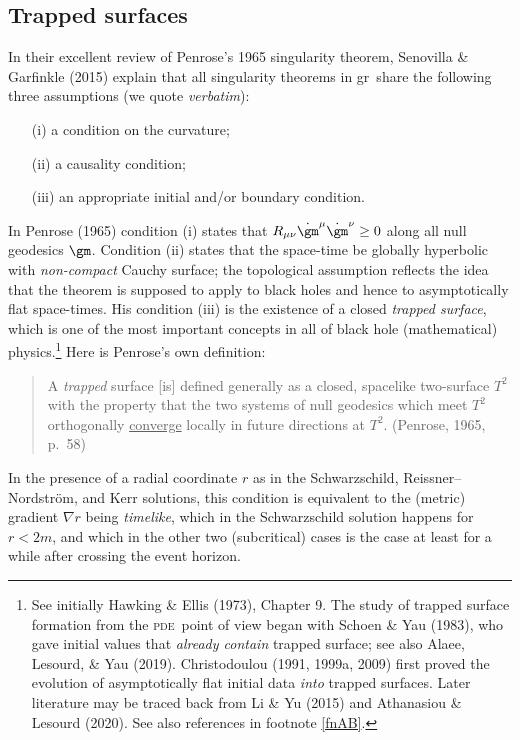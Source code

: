\documentclass[11pt,a4paper]{article}
\newcommand{\pde}{\textsc{pde}}
\newcommand{\GR}{{\sc gr}}
\begin{document}
\subsection{Trapped surfaces}
In their excellent review of Penrose's 1965 singularity theorem, Senovilla \& Garfinkle (2015) explain that all singularity theorems in \GR\ share the following three assumptions (we quote \emph{verbatim}):
\begin{enumerate}
\item[(i)] a condition on the curvature;
 \item[(ii)] a causality condition;
 \item[(iii)] an appropriate initial and/or boundary condition.
\end{enumerate}
In Penrose (1965) condition (i) states that $R_{\mu\nu}\dot{\gm}^{\mu}\dot{\gm}^{\nu}\geq 0$ along all null geodesics $\gm$.
Condition (ii) states that the space-time be globally hyperbolic with \emph{non-compact} Cauchy surface; the topological assumption reflects the idea  that the theorem is supposed to apply to black holes and hence to asymptotically flat space-times. His condition (iii) is the existence of a closed \emph{trapped surface}, which is one of the most important concepts in all of black hole (mathematical) physics.\footnote{See initially Hawking \& Ellis (1973), Chapter 9. The  study of trapped surface formation from the \pde\ point of view  began with
 Schoen \& Yau (1983), who gave initial values that \emph{already contain} trapped surface; see also Alaee, Lesourd, \& Yau (2019). 
Christodoulou (1991, 1999a, 2009) first proved the evolution of asymptotically flat initial data \emph{into} trapped surfaces.  
Later literature may be traced back from  Li \& Yu (2015) and  Athanasiou \& Lesourd (2020). 
See also  references in footnote \ref{fnAB}.}  Here is Penrose's  own definition:
 \begin{quote}
\begin{small}
A \emph{trapped} surface [is] defined generally as a closed, spacelike two-surface $T^2$ with the property that the two systems of null geodesics which meet $T^2$ orthogonally \ul{converge} locally in future directions at $T^2$.
(Penrose, 1965, p.\ 58)
\end{small}
\end{quote}
In the presence of a radial coordinate $r$  as in the Schwarzschild, Reissner--Nordstr\"{o}m, and Kerr solutions, this  condition is equivalent to the (metric) gradient $\nabla r$ being \emph{timelike}, which in the Schwarzschild solution
happens for $r<2m$, and which in the other two (subcritical) cases is the case at least for a while after crossing the  event horizon.
\end{document}
